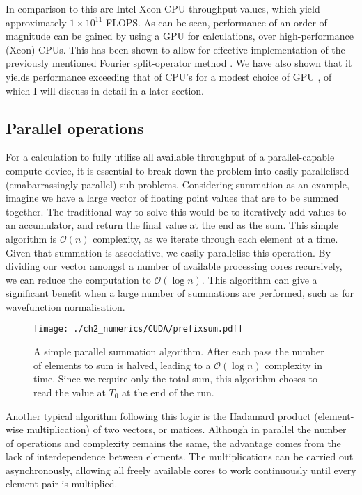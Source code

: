 In comparison to this are Intel Xeon CPU throughput values, which yield approximately $1\times10^{11}$ FLOPS. As can be seen, performance of an order of magnitude can be gained by using a GPU for calculations, over high-performance (Xeon) CPUs. This has been shown to allow for effective implementation of the previously mentioned Fourier split-operator method \cite{Num:Bauke_cpc_2011}. We have also shown that it yields performance exceeding that of CPU's for a modest choice of GPU \cite{AO:Morgan_ORiordan_pra_2013}, of which I will discuss in detail in a later section.

\subsection{Parallel operations}\label{subsec:par_op}
\label{sub:Parallel operations}
For a calculation to fully utilise all available throughput of a parallel-capable
compute device, it is essential to break down the problem into easily parallelised (emabarrassingly parallel) sub-problems. Considering summation as an example, imagine we have a large vector of floating point values that are to be summed together. The traditional way to solve this would be to iteratively add values to an accumulator, and return the final value at the end as the sum. This simple algorithm is $\mathcal{O}(n)$ complexity, as we iterate through each element at a time. Given that summation is associative, we easily parallelise this operation. By dividing our vector amongst a number of available processing cores recursively, we can reduce the computation to $\mathcal{O}(\log{} n)$. This algorithm can give a significant benefit when a large number of summations are performed, such as for wavefunction normalisation.

\begin{figure}
    \centering
    \texttt{[image: ./ch2\_numerics/CUDA/prefixsum.pdf]}
    \caption{A simple parallel summation algorithm. After each pass the number of elements to sum is halved, leading to a $\mathcal{O}(\log{} n)$ complexity in time. Since we require only the total sum, this algorithm choses to read the value at $T_0$ at the end of the run.}
    \label{fig:prefixsum}
\end{figure}

Another typical algorithm following this logic is the Hadamard product (element-wise multiplication) of two vectors, or matices. Although in parallel the number of operations and complexity remains the same, the advantage comes from the lack of interdependence between elements. The multiplications can be carried out asynchronously, allowing all freely available cores to work continuously until every element pair is multiplied.


